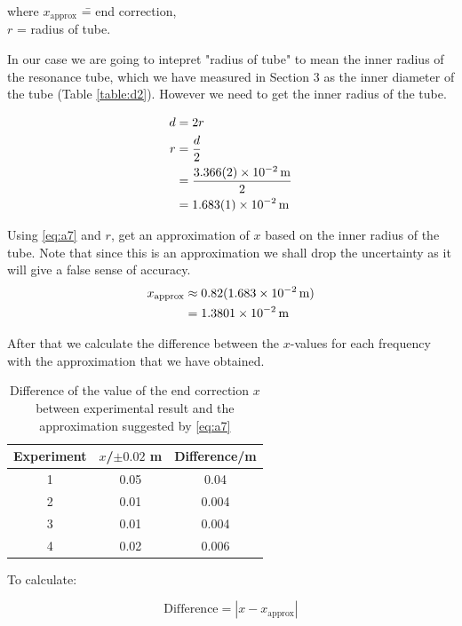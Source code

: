 \documentclass[letter]{article}
\numberwithin{equation}{section}
\numberwithin{figure}{section}
\numberwithin{table}{section}
\begin{document}
\begin{tabbing}
  where \= \(x_{\mathrm{approx}}\) \= = end correction, \\
  \> \(r\) \> = radius of tube.
\end{tabbing}

In our case we are going to intepret "radius of tube" to mean the inner radius of the resonance tube, which we have measured in Section 3 as the inner diameter of the tube (Table \ref{table:d2}). However we need to get the inner radius of the tube.

\begin{align*}
  d &= 2r \\
  r &= \frac{d}{2} \\
  &= \frac{\SI{3.366(2)d-2}{\metre}}{2} \\
  &= \SI{1.683(1)d-2}{\metre}
\end{align*}

Using \eqref{eq:a7} and \(r\), get an approximation of \(x\) based on the inner radius of the tube. Note that since this is an approximation we shall drop the uncertainty as it will give a false sense of accuracy.
\nopagebreak[3]
\begin{align*}
  x_{\mathrm{approx}} &\approx 0.82(\SI{1.683d-2}{\metre}) \\
  &= \SI{1.3801d-2}{\metre}
\end{align*}

After that we calculate the difference between the \(x\)-values for each frequency with the approximation that we have obtained.

\begin{table}[!h]
  \setlength\extrarowheight{2.5pt}
  \centering
  \begin{tabular}{|c|c|c|}
    \hline
    Experiment & {\(x\)/\(\pm 0.02\) \si{\metre}} & Difference/\si{m} \\
    \hline
    1 & 0.05 & 0.04 \\
    2 & 0.01 & 0.004 \\
    3 & 0.01 & 0.004 \\
    4 & 0.02 & 0.006 \\
    \hline
  \end{tabular}
  \label{table:a2}
  \caption{Difference of the value of the end correction \(x\) between experimental result and the approximation suggested by \eqref{eq:a7}}
\end{table}

To calculate:

\begin{equation}
  \text{Difference} = |x - x_{\mathrm{approx}}|
\end{equation}
\end{document}
